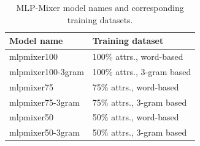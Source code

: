 \begin{table}[!th]
	\centering
	\begin{tabularx}{0.8\textwidth}{|l|X|}
		\hline
		\textbf{Model name} & \textbf{Training dataset} \\ \hline
		mlpmixer100 & 100\% attrs., word-based \\
		mlpmixer100-3gram & 100\% attrs., 3-gram based \\ 
		mlpmixer75 & 75\% attrs., word-based \\
		mlpmixer75-3gram & 75\% attrs., 3-gram based \\ 
		mlpmixer50 & 50\% attrs., word-based \\
		mlpmixer50-3gram & 50\% attrs., 3-gram based \\ 
		\hline
	\end{tabularx}
	\caption{MLP-Mixer model names and corresponding training datasets.}
	\label{tab:trained_mlpmixer_models}
\end{table}


